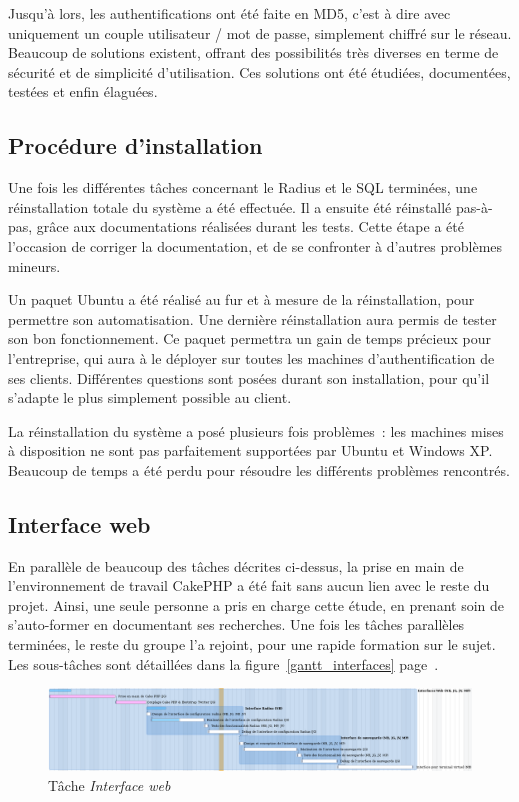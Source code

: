 Jusqu'à lors, les authentifications ont été faite en MD5, c'est à dire avec uniquement un couple utilisateur / mot de passe, simplement chiffré sur le réseau. Beaucoup de solutions existent, offrant des possibilités très diverses en terme de sécurité et de simplicité d'utilisation. Ces solutions ont été étudiées, documentées, testées et enfin élaguées.

\subsection{Procédure d'installation}

Une fois les différentes tâches concernant le Radius et le SQL terminées, une réinstallation totale du système a été effectuée. Il a ensuite été réinstallé pas-à-pas, grâce aux documentations réalisées durant les tests. Cette étape a été l'occasion de corriger la documentation, et de se confronter à d'autres problèmes mineurs.

Un paquet Ubuntu a été réalisé au fur et à mesure de la réinstallation, pour permettre son automatisation. Une dernière réinstallation aura permis de tester son bon fonctionnement. Ce paquet permettra un gain de temps précieux pour l'entreprise, qui aura à le déployer sur toutes les machines d'authentification de ses clients. Différentes questions sont posées durant son installation, pour qu'il s'adapte le plus simplement possible au client.

La réinstallation du système a posé plusieurs fois problèmes~: les machines mises à disposition ne sont pas parfaitement supportées par Ubuntu et Windows XP. Beaucoup de temps a été perdu pour résoudre les différents problèmes rencontrés.

\subsection{Interface web}

En parallèle de beaucoup des tâches décrites ci-dessus, la prise en main de l'environnement de travail CakePHP a été fait sans aucun lien avec le reste du projet. Ainsi, une seule personne a pris en charge cette étude, en prenant soin de s'auto-former en documentant ses recherches. Une fois les tâches parallèles terminées, le reste du groupe l'a rejoint, pour une rapide formation sur le sujet. Les sous-tâches sont détaillées dans la figure~\ref{gantt_interfaces} page~\pageref{gantt_interface}.

\begin{figure}[!h]
	\label{gantt_interface}
	\begin{center}
		\includegraphics[width=\textwidth]{img/gantt_interface.png}
	\end{center}
	\caption{Tâche \textit{Interface web}}
\end{figure}

